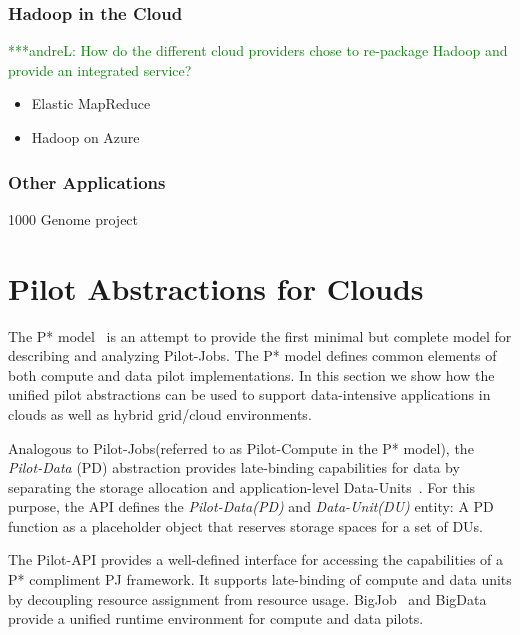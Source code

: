 \documentclass[times]{cpeauth}
\newcommand{\alnote}[1]{ {\textcolor{green} { ***andreL: #1 }}}
\newcommand{\alnote}[1]{}
\newcommand{\pilot}{Pilot\xspace}
\newcommand{\pilotjobs}{Pilot-Jobs\xspace}
\newcommand{\pilotcompute}{Pilot-Compute\xspace}
\newcommand{\pilotdata}{Pilot-Data\xspace}
\newcommand{\pd}{PD\xspace}
\newcommand{\dataunit}{Data-Unit\xspace}
\newcommand{\dataunits}{Data-Units\xspace}
\newcommand{\dus}{DUs\xspace}
\begin{document}
\subsubsection{Hadoop in the Cloud}

\alnote{How do the different cloud providers chose to re-package Hadoop and 
provide an integrated service?}

\begin{itemize}
	\item Elastic MapReduce
	\item Hadoop on Azure
\end{itemize}

\subsubsection{Other Applications}

1000 Genome project





\section{Pilot Abstractions for Clouds}

The P* model~\cite{pstar12} is an attempt to provide the first minimal but
complete model for describing and analyzing \pilotjobs. The P* model defines
common elements of both compute and data pilot implementations. In this 
section we show how the unified pilot abstractions can be used to support 
data-intensive applications in clouds as well as hybrid grid/cloud 
environments.

Analogous to \pilotjobs (referred to as \pilotcompute in the P* model), the
{\it Pilot-Data} (PD) abstraction provides late-binding capabilities for data
by separating the storage allocation and application-level
\dataunits~\cite{pstar12}. For this purpose, the API defines the {\it
\pilotdata (PD)} and {\it \dataunit (DU)} entity: A \pd function as a
placeholder object that reserves storage spaces for a set of \dus. 

The \pilot-API provides a well-defined interface for accessing the
capabilities of a P* compliment PJ framework. It supports late-binding of
compute and data units by decoupling resource assignment from resource usage.
BigJob~\cite{saga_bigjob_condor_cloud} and 
BigData~\cite{Mantha:2012:PEF:2287016.2287020} provide a unified runtime 
environment for compute and data pilots.
\end{document}
